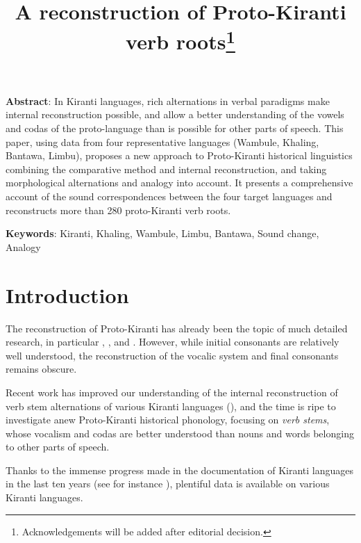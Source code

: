 \documentclass[oneside,a4paper,11pt]{article}
\begin{document}
\title{A reconstruction of Proto-Kiranti verb roots\footnote{Acknowledgements will be added after editorial decision.}} %
\maketitle
\sloppy

\textbf{Abstract}: In Kiranti languages, rich alternations in verbal paradigms make internal reconstruction possible, and allow a better understanding of the vowels and codas of the proto-language than is possible for other parts of speech. This paper, using data from four representative languages (Wambule, Khaling, Bantawa, Limbu), proposes a new approach to Proto-Kiranti historical linguistics combining the comparative method and internal reconstruction, and taking morphological alternations and analogy into account. It presents a comprehensive account of the sound correspondences between the four target languages and reconstructs more than 280 proto-Kiranti verb roots.

\textbf{Keywords}: Kiranti, Khaling, Wambule, Limbu, Bantawa, Sound change, Analogy

\section{Introduction}
The reconstruction of Proto-Kiranti has already been the topic of much detailed research, in particular \citet{starostin94kiranti}, \citet{michailovsky94stops}, \citet{opgenort05jero} and \citet{michailovsky10kiranti}. However, while  initial consonants are relatively well understood, the reconstruction of the vocalic system and final consonants remains obscure.  

Recent work has improved our understanding of the internal reconstruction of verb stem alternations of various Kiranti languages (\citealt{michailovsky02dico, lahaussois11thulung, jacques12khaling, michailovsky12dumi}), and the time is ripe to investigate anew Proto-Kiranti historical phonology, focusing on \textit{verb stems}, whose vocalism and codas are better understood than nouns and words belonging to other parts of speech.

Thanks to the immense progress made in the documentation of Kiranti languages in the last ten years (see for instance \citealt{bickel07chintang, bickel07puma, schackow08puma, doornenbal09, lahaussois09, huysmans2011sampang, schackow15yakkha}), plentiful data is available on various Kiranti languages. 
\end{document}
